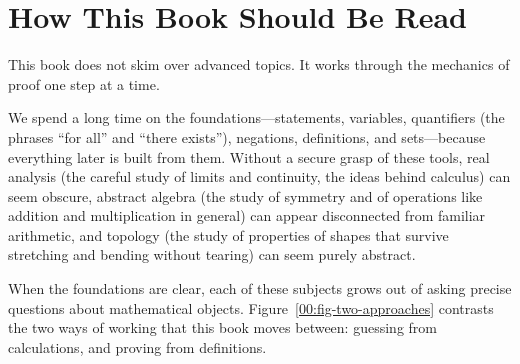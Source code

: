 \section*{How This Book Should Be Read}

This book does not skim over advanced topics. It works through the mechanics of proof one step at a time.

We spend a long time on the foundations---statements, variables, quantifiers (the phrases ``for all'' and ``there exists''), negations, definitions, and sets---because everything later is built from them. Without a secure grasp of these tools, real analysis (the careful study of limits and continuity, the ideas behind calculus) can seem obscure, abstract algebra (the study of symmetry and of operations like addition and multiplication in general) can appear disconnected from familiar arithmetic, and topology (the study of properties of shapes that survive stretching and bending without tearing) can seem purely abstract.

When the foundations are clear, each of these subjects grows out of asking precise questions about mathematical objects. Figure~\ref{00:fig-two-approaches} contrasts the two ways of working that this book moves between: guessing from calculations, and proving from definitions.

